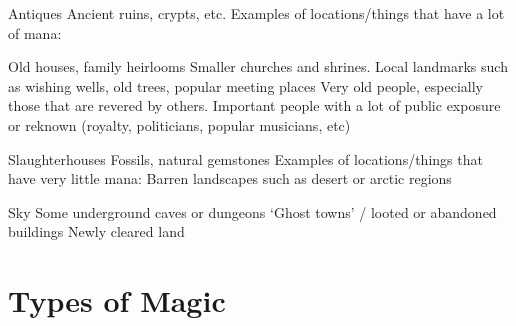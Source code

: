 \documentclass[twoside]{book}
\begin{document}
              Antiques   
              Ancient ruins, crypts, etc.   
            Examples of locations/things that have a lot of mana:
               
              Old houses, family heirlooms   
              Smaller churches and shrines.   
                Local landmarks such as wishing wells, old trees,
               popular meeting places 
                Very old people, especially those that are revered
               by others. 
                Important people with a lot of public exposure or
               reknown (royalty, politicians, popular musicians, etc)
               
              Slaughterhouses   
              Fossils, natural gemstones   
            Examples of locations/things that have very little
             mana:   
                Barren landscapes such as desert or arctic regions
               
              Sky   
              Some underground caves or dungeons   
                `Ghost towns' / looted or abandoned
               buildings 
              Newly cleared land   
          
\section{Types of Magic}
    
\end{document}
